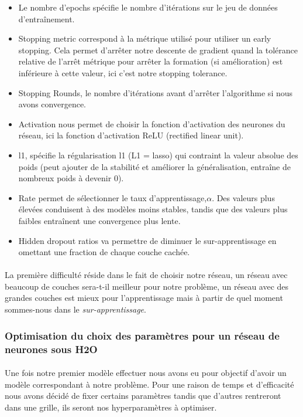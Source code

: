 \documentclass[14pt, openany]{article}
\begin{document}
\begin{itemize}
\item Le nombre d'epochs spécifie le nombre d'itérations sur le jeu de données d'entraînement.
\item Stopping metric correspond à la métrique utilisé pour utiliser un early stopping. Cela permet d'arrêter notre descente de gradient quand la tolérance relative de l'arrêt métrique pour arrêter la formation (si amélioration) est inférieure à cette valeur, ici c'est notre stopping tolerance.
\item Stopping Rounds, le nombre d'itérations avant d'arrêter l'algorithme si nous avons convergence.
\item  Activation nous permet de choisir la fonction d'activation des neurones du réseau, ici la fonction d'activation ReLU (rectified linear unit).
\item l1, spécifie la régularisation l1 (L1 = lasso) qui contraint la valeur absolue des poids (peut ajouter de la stabilité et améliorer la généralisation, entraîne de nombreux poids à devenir 0).
\item Rate permet de sélectionner le taux d'apprentissage,$\alpha$.  Des valeurs plus élevées conduisent à des modèles moins stables, tandis que des valeurs plus faibles entraînent une convergence plus lente.
\item Hidden dropout ratios va permettre de diminuer le sur-apprentissage en omettant une fraction de chaque couche cachée.
\end{itemize}


\paragraph{}
La première difficulté réside dans le fait de choisir notre réseau, un réseau avec beaucoup de couches sera-t-il meilleur pour notre problème, un réseau avec des grandes couches est mieux pour l'apprentissage mais à partir de quel moment sommes-nous dans le \textit{sur-apprentissage}.


\subsubsection{Optimisation du choix des paramètres pour un réseau de neurones sous H2O}

\paragraph{}
Une fois notre premier modèle effectuer nous avons eu pour objectif d'avoir un modèle correspondant à notre problème. Pour une raison de temps et d'efficacité nous avons décidé de fixer certains paramètres tandis que d'autres rentreront dans une grille, ils seront nos hyperparamètres à optimiser.
\end{document}
